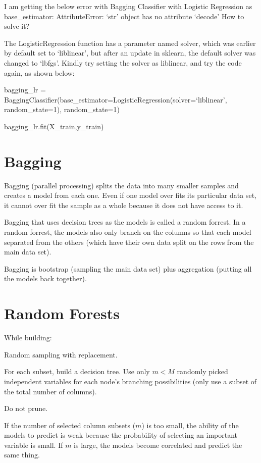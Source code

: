     \begin{qanda}
		\begin{question}I am getting the below error with Bagging Classifier with Logistic Regression as base\_estimator: AttributeError: `str' object has no attribute `decode' How to solve it?%
		\end{question}

		\begin{answer}
The LogisticRegression function has a parameter named solver, which was earlier by default set to `liblinear', but after an update in sklearn, the default solver was changed to `lbfgs'. Kindly try setting the solver as liblinear, and try the code again, as shown below:

bagging\_lr = BaggingClassifier(base\_estimator=LogisticRegression(solver=`liblinear', random\_state=1), random\_state=1)

bagging\_lr.fit(X\_train,y\_train)
		\end{answer}
    \end{qanda}

	\section{Bagging}
Bagging (parallel processing) splits the data into many smaller samples and creates a model from each one.  Even if one model over fits its particular data set, it cannot over fit the sample as a whole because it does not have access to it.

Bagging that uses decision trees as the models is called a random forrest.  In a random forrest, the models also only branch on the columns so that each model separated from the others (which have their own data split on the rows from the main data set).

Bagging is bootstrap (sampling the main data set) plus aggregation (putting all the models back together).

	\section{Random Forests}
While building:
	\begin{bulletedlist}
		\item Random sampling with replacement.
		\item For each subset, build a decision tree.  Use only $m<M$ randomly picked independent variables for each node's branching possibilities (only use a subset of the total number of columns).
		\item Do not prune.
	\end{bulletedlist}
If the number of selected column subsets ($m$) is too small, the ability of the models to predict is weak because the probability of selecting an important variable is small.  If $m$ is large, the models become correlated and predict the same thing.

